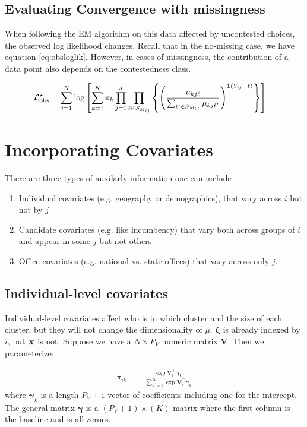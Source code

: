 \documentclass[11pt]{article}
\begin{document}
\subsection{Evaluating Convergence with missingness}

When following the EM algorithm on this data affected by uncontested choices, the observed log likelihood changes. Recall that in the no-missing case,  we have equation \ref{eq:obsloglik}. However, in cases of missingness, the contribution of a data point also depends on the contestedness class.

\begin{align}
{\mathcal{L}}^{\star}_{\text{obs}} &= \sum^{N}_{i=1}\log \left[\sum^{K}_{k=1}\pi_k \prod^{J}_{j=1}\prod_{\ell \in S_{M_{ij}}}\left\{\left(\frac{\mu_{kj\ell}}{\sum_{\ell^\prime \in S_{M_{ij}}} \mu_{kj\ell^\prime}}\right)^{\bm{1}\left(Y_{ij} = \ell\right)}\right\}\right]
\end{align}



\section{Incorporating Covariates}

There are three types of auxilarly information one can include
\begin{enumerate}
\item Individual covariates (e.g. geography or demographics), that vary across \(i\) but not by \(j\)
\item Candidate covariates (e.g. like incumbency) that vary both across groups of \(i\) and appear in some \(j\) but not others
\item Office covariates (e.g. national vs. state offices) that vary across only \(j\).
\end{enumerate}

\subsection{Individual-level covariates}

Individual-level covariates affect who is in which cluster and the size of each cluster, but they will not change the dimensionality of \(\mu\). \(\bm\zeta\) is already indexed by \(i\), but \(\bm{\pi}\) is not. Suppose we have a \(N \times P_V\) numeric matrix \(\mathbf{V}\). Then we parameterize:

\begin{align}\label{eq:theta_i}
\pi_{ik} &= \frac{\exp{\bm V_{i}^\top \bm\gamma_k}}{\sum_{k^\prime = 1}^K \exp{\bm V_{i}^\top \bm\gamma_k}}
\end{align}
where \(\bm\gamma_k\) is a length \(P_V + 1\) vector of coefficients including one for the intercept. The general matrix \(\mathbf{\gamma}\) is a \((P_V + 1) \times (K)\) matrix where the first column is the baseline and is all zeroes.
\end{document}
